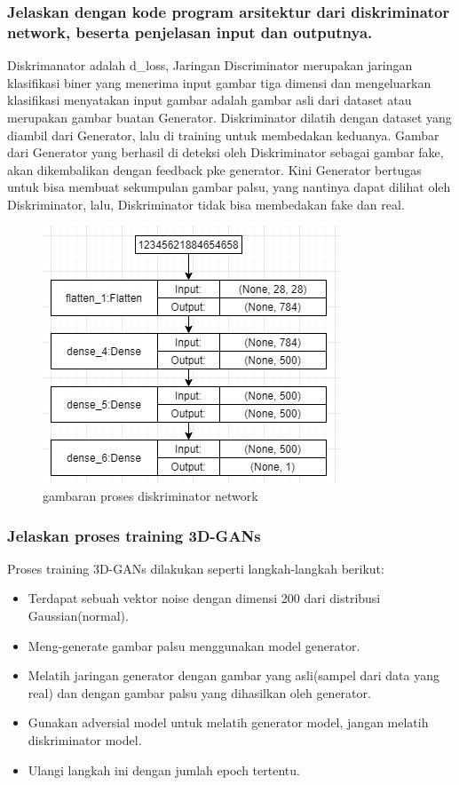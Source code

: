 \subsubsection{Jelaskan dengan kode program arsitektur dari diskriminator network, beserta penjelasan input dan outputnya.}
\hfill\break

Diskrimanator adalah d\_loss, Jaringan Discriminator merupakan jaringan klasifikasi biner yang menerima input gambar tiga dimensi dan mengeluarkan klasifikasi menyatakan input gambar adalah gambar asli dari dataset atau merupakan gambar buatan Generator. Diskriminator dilatih dengan dataset yang diambil dari Generator, lalu di training untuk membedakan keduanya. Gambar dari Generator yang berhasil di deteksi oleh Diskriminator sebagai gambar fake, akan dikembalikan dengan feedback pke generator. Kini Generator bertugas untuk bisa membuat sekumpulan gambar palsu, yang nantinya dapat dilihat oleh Diskriminator, lalu, Diskriminator tidak bisa membedakan fake dan real.
\begin{figure}[H]
	\centering
	\includegraphics[scale=0.5]{figures/1174066/8/4a.jpg}
	\caption{gambaran proses diskriminator network}
\end{figure}

\subsubsection{Jelaskan proses training 3D-GANs}
\hfill\break
Proses training 3D-GANs dilakukan seperti langkah-langkah berikut:
\begin{itemize}
	\item Terdapat sebuah vektor noise dengan dimensi 200 dari distribusi Gaussian(normal).
	\item Meng-generate gambar palsu menggunakan model generator.
	\item Melatih jaringan generator dengan gambar yang asli(sampel dari data yang real) dan dengan gambar palsu yang dihasilkan oleh generator.
	\item Gunakan adversial model untuk melatih generator model, jangan melatih diskriminator model.
	\item Ulangi langkah ini dengan jumlah epoch tertentu.
\end{itemize}


